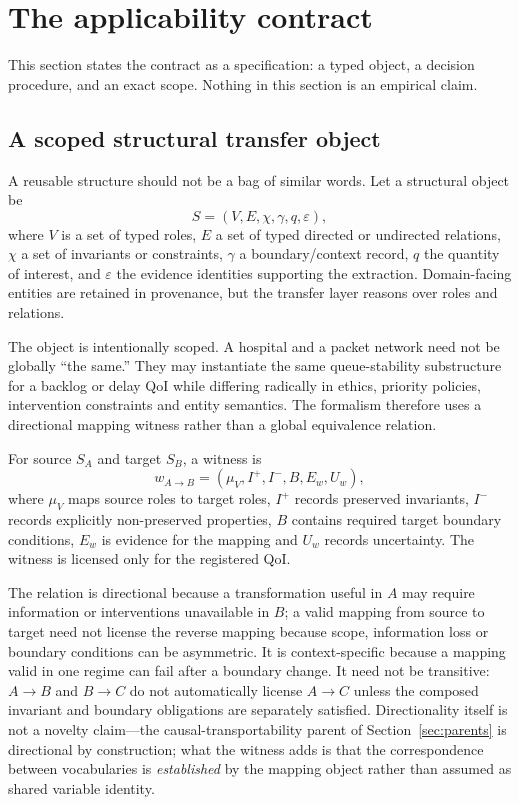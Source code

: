 \section{The applicability contract}
\label{sec:contract}

This section states the contract as a specification: a typed object, a decision procedure, and an exact scope. Nothing in this section is an empirical claim.

\subsection{A scoped structural transfer object}

A reusable structure should not be a bag of similar words. Let a structural object be
\[
S=(V,E,\chi,\gamma,q,\varepsilon),
\]
where $V$ is a set of typed roles, $E$ a set of typed directed or undirected relations, $\chi$ a set of invariants or constraints, $\gamma$ a boundary/context record, $q$ the quantity of interest, and $\varepsilon$ the evidence identities supporting the extraction. Domain-facing entities are retained in provenance, but the transfer layer reasons over roles and relations.

The object is intentionally scoped. A hospital and a packet network need not be globally ``the same.'' They may instantiate the same queue-stability substructure for a backlog or delay QoI while differing radically in ethics, priority policies, intervention constraints and entity semantics. The formalism therefore uses a directional mapping witness rather than a global equivalence relation.

\begin{definition}
For source $S_A$ and target $S_B$, a witness is
\[
w_{A\to B}=(\mu_V,I^+,I^-,B,E_w,U_w),
\]
where $\mu_V$ maps source roles to target roles, $I^+$ records preserved invariants, $I^-$ records explicitly non-preserved properties, $B$ contains required target boundary conditions, $E_w$ is evidence for the mapping and $U_w$ records uncertainty. The witness is licensed only for the registered QoI.
\end{definition}

The relation is directional because a transformation useful in $A$ may require information or interventions unavailable in $B$; a valid mapping from source to target need not license the reverse mapping because scope, information loss or boundary conditions can be asymmetric. It is context-specific because a mapping valid in one regime can fail after a boundary change. It need not be transitive: $A\to B$ and $B\to C$ do not automatically license $A\to C$ unless the composed invariant and boundary obligations are separately satisfied. Directionality itself is not a novelty claim---the causal-transportability parent of Section~\ref{sec:parents} is directional by construction; what the witness adds is that the correspondence between vocabularies is \emph{established} by the mapping object rather than assumed as shared variable identity.

